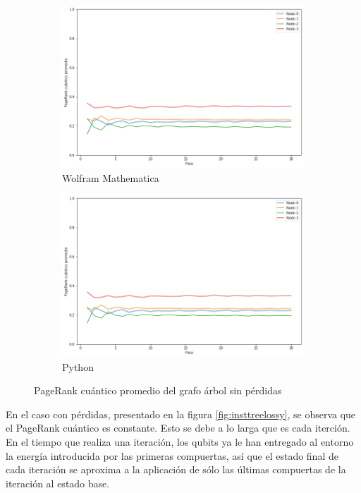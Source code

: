 \begin{figure}[H]
    \centering
    \begin{subfigure}[m]{0.45\textwidth}
        \centering
        \includegraphics[width=0.9\linewidth]{img/tree-mean-M.png}
        \caption{Wolfram Mathematica}
    \end{subfigure}
    \begin{subfigure}[m]{0.45\textwidth}
        \centering
        \includegraphics[width=0.9\linewidth]{img/tree-mean-lossless.png}
        \caption{Python}
    \end{subfigure}
    \caption[PageRank cuántico promedio del grafo árbol sin pérdidas]{PageRank cuántico promedio del grafo árbol sin pérdidas}
    \label{fig:meantreelossless}
\end{figure}

En el caso con pérdidas, presentado en la figura \ref{fig:insttreelossy}, se observa que el PageRank cuántico es constante. Esto se debe a lo larga que es cada iterción. En el tiempo que realiza una iteración, los qubits ya le han entregado al entorno la energía introducida por las primeras compuertas, así que el estado final de cada iteración se aproxima a la aplicación de sólo las últimas compuertas de la iteración al estado base.

